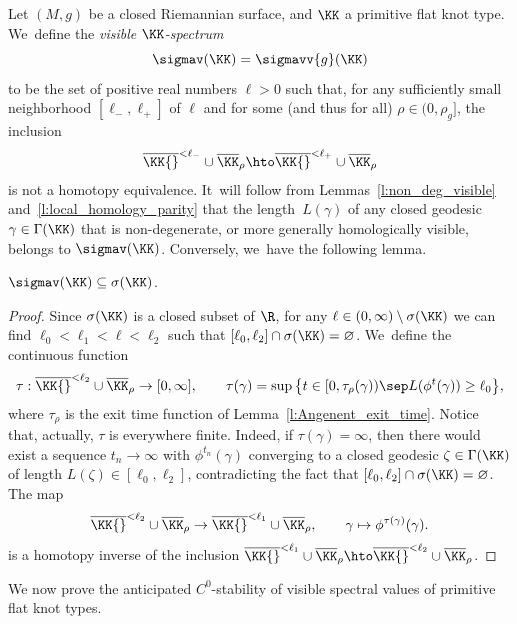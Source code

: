 Let $(M,g)$ be a closed Riemannian surface, and $\KK$ a primitive flat knot type. We~define the \emph{visible $\KK$-spectrum}
\[
\sigmav(\KK)=\sigmavv{g}(\KK)
\]
to be the set of positive real numbers $\ell>0$ such that, for any sufficiently small neighborhood $[\ell_-,\ell_+]$ of $\ell$ and for some (and thus for all) $\rho\in(0,\rho_g]$, the inclusion
\begin{align*}
\overline\KK{}^{<\ell_-}\cup\overline\KK_{\rho}
\hto
\overline\KK{}^{<\ell_+}\cup\overline\KK_{\rho}
\end{align*}
is not a homotopy equivalence. It~will follow from Lemmas~\ref{l:non_deg_visible} and~\ref{l:local_homology_parity} that the length~$L(\gamma)$ of any closed geodesic $\gamma\in\Gamma(\KK)$ that is non-degenerate, or more generally homologically visible, belongs to $\sigmav(\KK)$. Conversely, we~have the following lemma.

\begin{Lemma}
$\sigmav(\KK)\subseteq\sigma(\KK)$.
\end{Lemma}

\begin{proof}
Since $\sigma(\KK)$ is a closed subset of $\R$, for any $\ell\in(0,\infty)\setminus\sigma(\KK)$ we can find $\ell_0<\ell_1<\ell<\ell_2$ such that $[\ell_0,\ell_2]\cap\sigma(\KK)=\varnothing$. We~define the continuous function
\begin{align*}
\tau:\overline\KK{}^{< \ell_2}\cup\overline\KK_\rho\to[0,\infty],
\qquad
\tau(\gamma) = \sup\big\{ t\in[0,\tau_\rho(\gamma))\sep L(\phi^t(\gamma))\geq \ell_0\big\},
\end{align*}
where $\tau_\rho$ is the exit time function of Lemma~\ref{l:Angenent_exit_time}.
Notice that, actually, $\tau$ is everywhere finite. Indeed, if $\tau(\gamma)=\infty$, then there would exist a sequence $t_n\to\infty$ with $\phi^{t_n}(\gamma)$ converging to a closed geodesic $\zeta\in\Gamma(\KK)$ of length $L(\zeta)\in[\ell_0,\ell_2]$, contradicting the fact that $[\ell_0,\ell_2]\cap\sigma(\KK)=\varnothing$. The map
\begin{align*}
\overline\KK{}^{<\ell_2}\cup\overline\KK_{\rho}
\to
\overline\KK{}^{<\ell_1}\cup\overline\KK_{\rho},
\qquad
\gamma\mapsto\phi^{\tau(\gamma)}(\gamma).
\end{align*}
is a homotopy inverse of the inclusion $\overline\KK{}^{<\ell_1}\cup\overline\KK_{\rho}
\hto
\overline\KK{}^{<\ell_2}\cup\overline\KK_{\rho}$.
\end{proof}

We now prove the anticipated $C^0$-stability of visible spectral values of primitive flat knot types.

